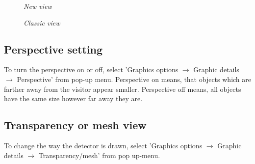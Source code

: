 \documentclass[a4paper,10pt]{article}
\begin{document}
\begin{figure}[h]
\begin{minipage}[t]{6cm}
\setlength{\fboxsep}{0mm}
\centerline{}
\caption{\label{CEDViewer} \textsl{New view}}
\end{minipage}
\hfill
\begin{minipage}[t]{6cm}
\setlength{\fboxsep}{0mm}
\centerline{}
\caption{\label{DSTViewer}\textsl{Classic view}}
\end{minipage}
\end{figure}


\subsection{Perspective setting}
To turn the perspective on or off, select 'Graphics options $\rightarrow$ Graphic details $\rightarrow$ Perspective' from pop-up menu. Perspective on means, that objects which are farther away from the visitor appear smaller. Perspective off means, all objects have the same size however far away they are. 

\subsection{Transparency or mesh view}
To change the way the detector is drawn, select 'Graphics options $\rightarrow$ Graphic details $\rightarrow$ Transparency/mesh' from pop up-menu.
\end{document}
